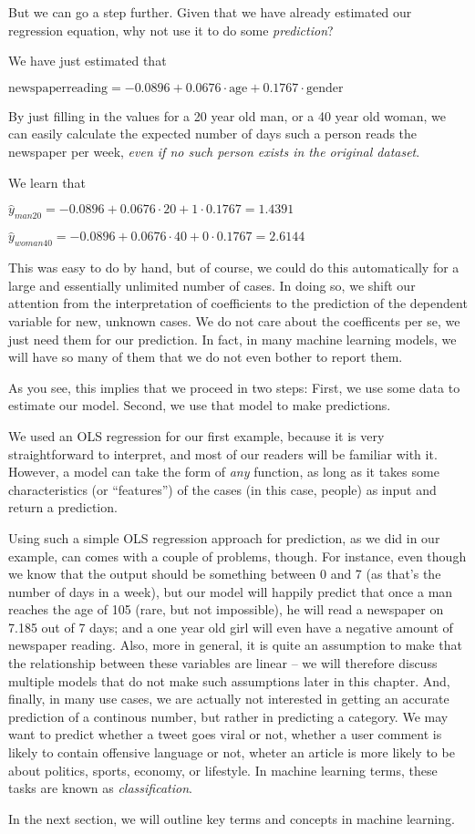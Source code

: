 But we can go a step further. Given that we have already estimated our
regression equation, why not use it to do some \emph{prediction}?

We have just estimated that

$\textrm{newspaperreading} = -0.0896 + 0.0676 \cdot \textrm{age} + 0.1767 \cdot \textrm{gender}$

By just filling in the values for a 20 year old man, or a 40 year old woman,
we can easily calculate the expected number of days such a person reads
the newspaper per week, \emph{even if no such person exists in the original dataset}.

We learn that

$\hat{y}_{man20} = -0.0896 + 0.0676 \cdot 20 + 1 \cdot 0.1767 = 1.4391$

$\hat{y}_{woman40} = -0.0896 + 0.0676 \cdot 40 + 0 \cdot 0.1767 = 2.6144$

This was easy to do by hand, but of course, we could do this automatically for a
large and essentially unlimited number of cases.
In doing so, we shift our attention from the interpretation of coefficients to
the prediction of the dependent variable for new, unknown cases. We do not
care about the coefficents per se, we just need them for our prediction.
In fact, in many machine learning models, we will have so many of them that
we do not even bother to report them.

As you see, this implies that we proceed in two steps: First, we use some data
to estimate our model. Second, we use that model to make predictions.

We used an OLS regression for our first example, because it is very straightforward
to interpret, and most of our readers will be familiar with it.
However, a model can take the form of \emph{any} function, as long as it takes
some characteristics (or ``features'') of the cases (in this case, people) as
input and return a prediction.

Using such a simple OLS regression approach for prediction, as we did in our
example, can comes with a couple of problems, though.
For instance, even though we know that the output should be something between
0 and 7 (as that's the number of days in a week), but our model will happily
predict that once a man reaches the age of 105 (rare, but not impossible), he
will read a newspaper on 7.185 out of 7 days; and a one year old girl will
even have a negative amount of newspaper reading.
Also, more in general, it is quite an assumption to make that the relationship
between these variables are linear -- we will therefore discuss multiple
models that do not make such assumptions later in this chapter.
And, finally, in many use cases, we are actually not interested in getting
an accurate prediction of a continous number, but rather in predicting a
category. We may want to predict whether a tweet goes viral or not, whether
a user comment is likely to contain offensive language or not, wheter an article
is more likely to be about politics, sports, economy, or lifestyle.
In machine learning terms, these tasks are known as \emph{classification}.

In the next section, we will outline key terms and concepts in machine learning.
